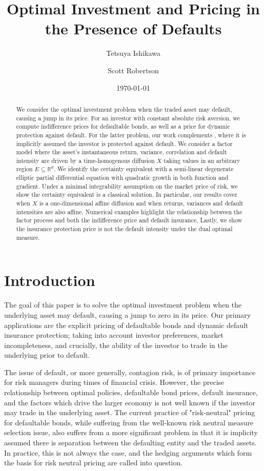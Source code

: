 \documentclass[11pt, letterpaper]{amsart}
\title[Pricing with Default]{Optimal Investment and Pricing in the Presence of Defaults}
\author{Tetsuya Ishikawa}
\author{Scott Robertson}
\date{\today}
\theoremstyle{definition}
\theoremstyle{remark}
\numberwithin{equation}{section}
\newcommand{\reals}{\mathbb R}
\begin{document}
\begin{abstract}
We consider the optimal investment problem when the traded asset may default, causing a jump in its price.  For an investor with constant absolute risk aversion, we compute indifference prices for defaultable bonds, as well as a price for dynamic protection against default.  For the latter problem, our work complements \cite{MR2359373}, where it is implicitly assumed the investor is protected against default. We consider a factor model where the asset's instantaneous return, variance, correlation and default intensity are driven by a time-homogenous diffusion $X$ taking values in an arbitrary region $E\subseteq\reals^d$.  We identify the certainty equivalent with a semi-linear degenerate elliptic partial differential equation with quadratic growth in both function and gradient.  Under a minimal integrability assumption on the market price of risk, we show the certainty equivalent is a classical solution.  In particular, our results cover when $X$ is a one-dimensional affine diffusion and when returns, variances and default intensities are also affine.  Numerical examples highlight the relationship between the factor process and both the indifference price and default insurance.  Lastly, we show the insurance protection price is not the default intensity under the dual optimal measure.
\end{abstract}

\maketitle

\section*{Introduction}\label{S:intro}  The goal of this paper is to solve the optimal investment problem when the underlying asset may default, causing a jump to zero in its price.  Our primary applications are the explicit pricing of defaultable bonds and dynamic default insurance protection; taking into account investor preferences, market incompleteness, and crucially, the ability of the investor to trade in the underlying prior to default.

The issue of default, or more generally, contagion risk, is of primary importance for risk managers during times of financial crisis.  However, the precise relationship between optimal policies, defaultable bond prices, default insurance, and the factors which drive the larger economy is not well known if the investor may trade in the underlying asset.  The current practice of "risk-neutral" pricing for defaultable bonds, while suffering from the well-known  risk neutral measure selection issue, also suffers from a more significant problem in that it is implicity assumed there is separation between the defaulting entity and the traded assets.  In practice, this is not always the case, and the hedging arguments which form the basis for risk neutral pricing are called into question.
\end{document}
